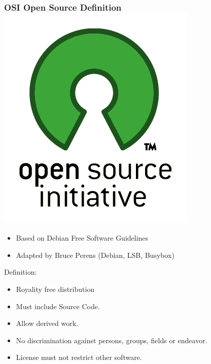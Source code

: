 \documentclass[hyperref={pdfpagelabels=false},xcolor=pst,pdf,fragile]{beamer}
\begin{document}
\begin{frame}
  \frametitle{OSI Open Source Definition \includegraphics[scale=0.07]{img/osi_standard_logo.png}}

  \begin{itemize}
	\item Based on Debian Free Software Guidelines
	\item Adapted by Bruce Perens (Debian, LSB, Busybox)
  \end{itemize}

  \pause

  Definition:
  \begin{itemize}
	\item Royality free distribution
	\item Must include Source Code.
	\item Allow derived work.
	\item No discrimination against persons, groups, fields or endeavor.
	\item License must not restrict other software.
  \end{itemize}

\end{frame}
\end{document}
